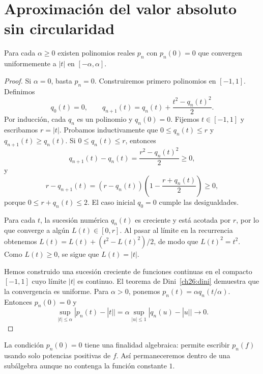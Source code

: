 \section{Aproximación del valor absoluto sin circularidad}
\begin{lema}\label{ch28:abspolinomios}
Para cada $\alpha\ge0$ existen polinomios reales $p_n$ con $p_n(0)=0$ que convergen uniformemente a $|t|$ en $[-\alpha,\alpha]$.
\end{lema}
\begin{proof}
Si $\alpha=0$, basta $p_n=0$. Construiremos primero polinomios en $[-1,1]$. Definimos
\[
 q_0(t)=0,\qquad q_{n+1}(t)=q_n(t)+\frac{t^2-q_n(t)^2}{2}.
\]
Por inducción, cada $q_n$ es un polinomio y $q_n(0)=0$. Fijemos $t\in[-1,1]$ y escribamos $r=|t|$. Probamos inductivamente que $0\le q_n(t)\le r$ y $q_{n+1}(t)\ge q_n(t)$. Si $0\le q_n(t)\le r$, entonces
\[
 q_{n+1}(t)-q_n(t)=\frac{r^2-q_n(t)^2}{2}\ge0,
\]
y
\[
 r-q_{n+1}(t)
 =(r-q_n(t))\left(1-\frac{r+q_n(t)}2\right)\ge0,
\]
porque $0\le r+q_n(t)\le2$. El caso inicial $q_0=0$ cumple las desigualdades.

Para cada $t$, la sucesión numérica $q_n(t)$ es creciente y está acotada por $r$, por lo que converge a algún $L(t)\in[0,r]$. Al pasar al límite en la recurrencia obtenemos
$L(t)=L(t)+(t^2-L(t)^2)/2$, de modo que $L(t)^2=t^2$. Como $L(t)\ge0$, se sigue que $L(t)=|t|$.

Hemos construido una sucesión creciente de funciones continuas en el compacto $[-1,1]$ cuyo límite $|t|$ es continuo. El teorema de Dini~\ref{ch26:dini} demuestra que la convergencia es uniforme. Para $\alpha>0$, ponemos $p_n(t)=\alpha q_n(t/\alpha)$. Entonces $p_n(0)=0$ y
\[
 \sup_{|t|\le\alpha}|p_n(t)-|t||
 =\alpha\sup_{|u|\le1}|q_n(u)-|u||\longrightarrow0.
\]
\end{proof}

La condición $p_n(0)=0$ tiene una finalidad algebraica: permite escribir $p_n(f)$ usando solo potencias positivas de $f$. Así permaneceremos dentro de una subálgebra aunque no contenga la función constante $1$.

